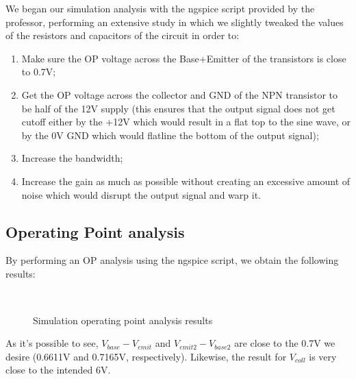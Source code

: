 \hspace{12pt} We began our simulation analysis with the ngspice script provided by the professor, performing an extensive study in which we slightly tweaked the values of the resistors and capacitors of the circuit in order to:
\begin{enumerate}
	\item{Make sure the OP voltage across the Base+Emitter of the transistors is close to 0.7V;}
	\item{Get the OP voltage across the collector and GND of the NPN transistor to be half of the 12V supply (this ensures that the output signal does not get cutoff either by the +12V which would result in a flat top to the sine wave, or by the 0V GND which would flatline the bottom of the output signal);}
	\item{Increase the bandwidth;}
	\item{Increase the gain as much as possible without creating an excessive amount of noise which would disrupt the output signal and warp it.}
\end{enumerate}

\subsection{Operating Point analysis}

By performing an OP analysis using the ngspice script, we obtain the following results:

\begin{figure}[h]
	\centering
	\begin{minipage}[t]{.45\textwidth}
		\centering
			\begin{tabular}{|c|c|}
			\hline
			
		\end{tabular}
	\end{minipage}
	\begin{minipage}[t]{.45\textwidth}
		\centering
			\begin{tabular}{|c|c|}
			\hline
			
		\end{tabular}
	\end{minipage}
	\caption{Simulation operating point analysis results}
	\label{fig:op_sim}
\end{figure}

As it's possible to see, $V_{base} - V_{emit}$ and $V_{emit2} - V_{base2}$ are close to the 0.7V we desire (0.6611V and 0.7165V, respectively). Likewise, the result for $V_{coll}$ is very close to the intended 6V.

